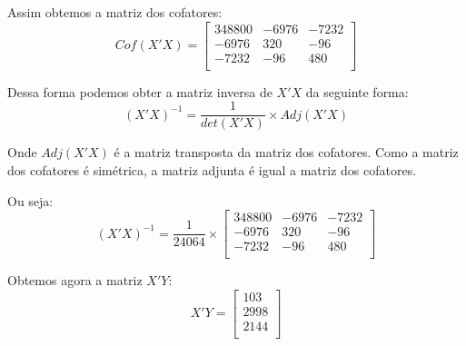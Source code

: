 \documentclass[]{ufpe-exercises}
\begin{document}
\begin{questions}
\begin{parts}
\begin{solution}
			Assim obtemos a matriz  dos cofatores:
			\[ Cof(X'X) =
				\begin{bmatrix}
					348800 & -6976 & -7232 \\
					-6976  & 320   & -96   \\
					-7232  & -96   & 480   \\
				\end{bmatrix}
			\]

			Dessa forma podemos obter a matriz inversa de \(X'X\) da seguinte forma:
			\[(X'X)^{-1} = \frac{1}{det(X'X)} \times Adj(X'X)
			\]

			Onde \(Adj(X'X)\) é a matriz transposta da matriz dos cofatores. Como a matriz dos cofatores é simétrica, a matriz adjunta é igual a matriz dos cofatores.

			Ou seja:
			\[(X'X)^{-1} =
				\frac{1}{24064} \times
				\begin{bmatrix}
					348800 & -6976 & -7232 \\
					-6976  & 320   & -96   \\
					-7232  & -96   & 480   \\
				\end{bmatrix}
			\]

			Obtemos agora a matriz \(X'Y\):
			\[
				X'Y =
				\begin{bmatrix}
					103  \\
					2998 \\
					2144 \\
				\end{bmatrix}
			\]


\end{solution}
\end{parts}
\end{questions}
\end{document}
